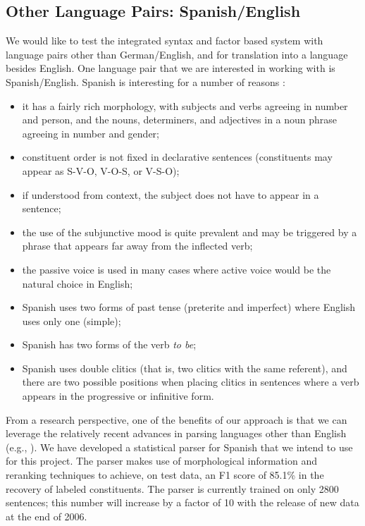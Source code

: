 \documentclass[11pt]{report}
\theoremstyle{plain}
\begin{document}
{\subsection{Other Language Pairs: Spanish/English}
We would like to test the integrated syntax and factor based system
with language pairs other than German/English, and for translation
into a language besides English.  One language pair that we are
interested in working with is Spanish/English. Spanish is interesting
for a number of reasons :

\begin{itemize}
\item it has a fairly rich morphology, with subjects and verbs
agreeing in number and person, and the nouns, determiners, and
adjectives in a noun phrase agreeing in number and gender;
\item constituent order is not fixed in declarative sentences
(constituents may appear as S-V-O, V-O-S, or V-S-O);
\item if understood from context, the subject does not have to appear
in a sentence;
\item the use of the subjunctive mood is quite prevalent and may be
triggered by a phrase that appears far away from the inflected verb;
\item the passive voice is used in many cases where active voice would
be the natural choice in English;
\item Spanish uses two forms of past tense (preterite and imperfect)
where English uses only one (simple);
\item Spanish has two forms of the verb {\em to be};
\item Spanish uses double clitics (that is, two clitics with the same
referent), and there are two possible positions when placing clitics
in sentences where a verb appears in the progressive or infinitive
form.
\end{itemize} 

From a research perspective, one of the benefits of our approach is
that we can leverage the relatively recent advances in parsing
languages other than English (e.g.,
). We have developed a
statistical parser for Spanish  that we intend to use
for this project. The parser makes use of morphological information
and reranking techniques to achieve, on test data, an F1 score of
85.1\% in the recovery of labeled constituents.  The parser is
currently trained on only 2800 sentences; this number will increase by
a factor of 10 with the release of new data at the end of 2006.

}
\end{document}
